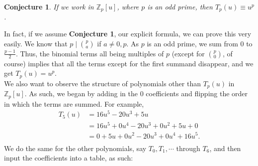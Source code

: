\documentclass[12pt, letterpaper]{article} %
\newtheorem{conjecture}{Conjecture}
\begin{document}
\begin{conjecture} If we work in $\mathbb{Z}_p[u]$, where $p$ is an odd prime, then $T_p(u) \equiv u^p$. \end{conjecture}

In fact, if we assume \textbf{Conjecture 1}, our explicit formula, we can prove this very easily. We know that $p \mid \binom{p}{a}$ if $a \neq 0,p$. As $p$ is an odd prime, we sum from $0$ to $\frac{p-1}{2}$. Thus, the binomial terms all being multiples of $p$ (except for $\binom{p}{0}$, of course) implies that all the terms except for the first summand disappear, and we get $T_p(u) = u^p$. \\

We also want to observe the structure of polynomials other than $T_p(u)$ in $\mathbb{Z}_p[u]$. As such, we began by adding in the $0$ coefficients and flipping the order in which the terms are summed. For example,
\begin{align*}
    T_5(u) & = 16u^5 - 20u^3 + 5u\\
    & = 16u^5 + 0u^4 - 20u^3 + 0u^2 + 5u + 0\\
    & = 0 + 5u + 0u^2 - 20u^3 + 0u^4 +16u^5. \\
\end{align*}
We do the same for the other polynomials, say $T_0,T_1,\cdots $ through $T_6$, and then input the coefficients into a table, as such:
\end{document}
